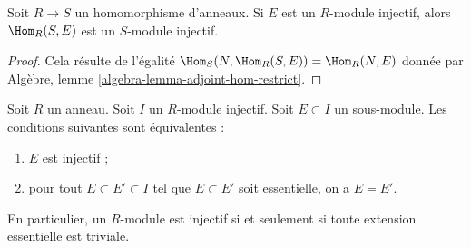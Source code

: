 \begin{lemma}
\label{lemma-hom-injective}
Soit $R \to S$ un homomorphisme d'anneaux. Si $E$ est un $R$-module injectif,
alors $\Hom_R(S, E)$ est un $S$-module injectif.
\end{lemma}

\begin{proof}
Cela résulte de l'égalité $\Hom_S(N, \Hom_R(S, E)) = \Hom_R(N, E)$ donnée par
Algèbre, lemme \ref{algebra-lemma-adjoint-hom-restrict}.
\end{proof}

\begin{lemma}
\label{lemma-essential-extensions-in-injective}
Soit $R$ un anneau. Soit $I$ un $R$-module injectif. Soit $E \subset I$
un sous-module. Les conditions suivantes sont équivalentes :
\begin{enumerate}
\item $E$ est injectif ;
\item pour tout $E \subset E' \subset I$ tel que $E \subset E'$ soit essentielle,
on a $E = E'$.
\end{enumerate}
En particulier, un $R$-module est injectif si et seulement si toute
extension essentielle est triviale.
\end{lemma}

